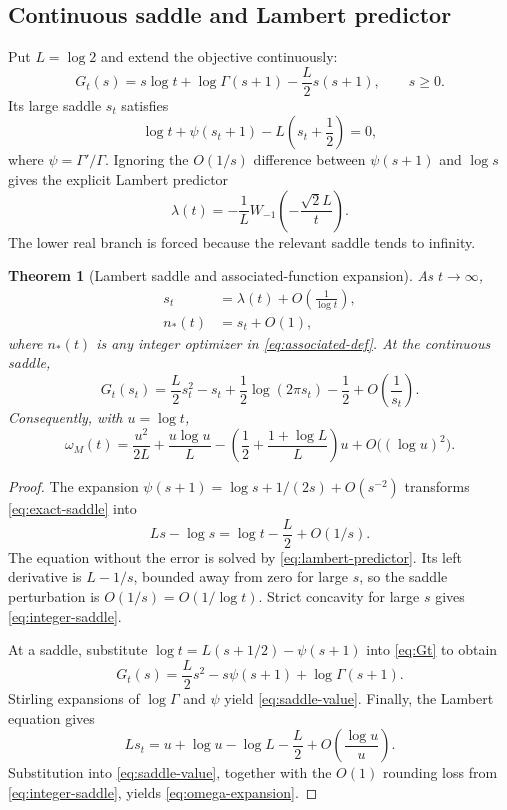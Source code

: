 \documentclass[11pt,a4paper]{article}
\newtheorem{theorem}{Theorem}[section]
\theoremstyle{definition}
\theoremstyle{remark}
\begin{document}
\subsection{Continuous saddle and Lambert predictor}

Put $L=\log2$ and extend the objective continuously:
\begin{equation}
  G_t(s)=s\log t+\log\Gamma(s+1)-\frac L2s(s+1),
  \qquad s\ge0.
  \label{eq:Gt}
\end{equation}
Its large saddle $s_t$ satisfies
\begin{equation}
  \log t+\psi(s_t+1)-L\left(s_t+\frac12\right)=0,
  \label{eq:exact-saddle}
\end{equation}
where $\psi=\Gamma'/\Gamma$.
Ignoring the $O(1/s)$ difference between $\psi(s+1)$ and $\log s$ gives the explicit
Lambert predictor
\begin{equation}
  \lambda(t)=
  -\frac1L
  W_{-1}\!\left(-\frac{\sqrt2L}{t}\right).
  \label{eq:lambert-predictor}
\end{equation}
The lower real branch is forced because the relevant saddle tends to infinity.

\begin{theorem}[Lambert saddle and associated-function expansion]
\label{thm:lambert-saddle}
As $t\to\infty$,
\begin{align}
  s_t&=\lambda(t)+O\left(\frac1{\log t}\right),
  \label{eq:s-lambda}\\
  n_*(t)&=s_t+O(1),
  \label{eq:integer-saddle}
\end{align}
where $n_*(t)$ is any integer optimizer in \eqref{eq:associated-def}.  At the
continuous saddle,
\begin{equation}
 G_t(s_t)=
 \frac L2s_t^2-s_t+\frac12\log(2\pi s_t)-\frac12
 +O\left(\frac1{s_t}\right).
 \label{eq:saddle-value}
\end{equation}
Consequently, with $u=\log t$,
\begin{equation}
 \omega_M(t)=
 \frac{u^2}{2L}
 +\frac{u\log u}{L}
 -\left(\frac12+\frac{1+\log L}{L}\right)u
 +O\bigl((\log u)^2\bigr).
 \label{eq:omega-expansion}
\end{equation}
\end{theorem}

\begin{proof}
The expansion
$\psi(s+1)=\log s+1/(2s)+O(s^{-2})$ transforms
\eqref{eq:exact-saddle} into
\[
  Ls-\log s=\log t-\frac L2+O(1/s).
\]
The equation without the error is solved by \eqref{eq:lambert-predictor}.  Its
left derivative is $L-1/s$, bounded away from zero for large $s$, so the saddle
perturbation is $O(1/s)=O(1/\log t)$.  Strict concavity for large $s$ gives
\eqref{eq:integer-saddle}.

At a saddle, substitute
$\log t=L(s+1/2)-\psi(s+1)$ into \eqref{eq:Gt} to obtain
\[
  G_t(s)=\frac L2s^2-s\psi(s+1)+\log\Gamma(s+1).
\]
Stirling expansions of $\log\Gamma$ and $\psi$ yield
\eqref{eq:saddle-value}.  Finally, the Lambert equation gives
\[
  Ls_t=u+\log u-\log L-\frac L2+O\left(\frac{\log u}{u}\right).
\]
Substitution into \eqref{eq:saddle-value}, together with the $O(1)$ rounding loss
from \eqref{eq:integer-saddle}, yields \eqref{eq:omega-expansion}.
\end{proof}
\end{document}
